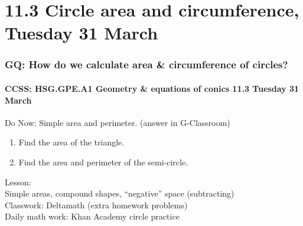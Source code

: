 \documentclass{beamer}
\begin{document}
\section{11.3 Circle area and circumference, Tuesday 31 March} 
\frame
{
  \frametitle{GQ: How do we calculate area \& circumference of circles?}
  \framesubtitle{CCSS: HSG.GPE.A1 Geometry \& equations of conics \hfill \alert{11.3 Tuesday 31 March}}

  \begin{block}{Do Now: Simple area and perimeter. (answer in G-Classroom)}
    \begin{enumerate}
      \item Find the area of the triangle.
      \item Find the area and perimeter of the semi-circle.
    \end{enumerate}
    \end{block}
    \begin{center}
    \end{center}
    Lesson: \\
    \; Simple areas, compound shapes, ``negative'' space (subtracting) \\ 
    Classwork: Deltamath (extra homework problems)\\ 
    Daily math work: Khan Academy circle practice
}
\end{document}
